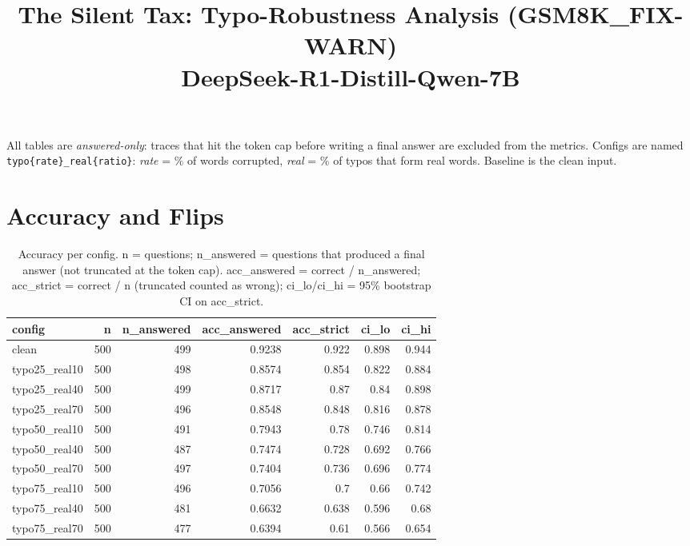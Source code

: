 \documentclass[11pt]{article}
\title{The Silent Tax: Typo-Robustness Analysis (GSM8K\_FIX-WARN)\\\large DeepSeek-R1-Distill-Qwen-7B}
\date{}
\begin{document}
\maketitle
\noindent All tables are \emph{answered-only}: traces that hit the token cap before writing a final answer are excluded from the metrics. Configs are named \texttt{typo\{rate\}\_real\{ratio\}}: \emph{rate} = \% of words corrupted, \emph{real} = \% of typos that form real words. Baseline is the clean input.

\section*{Accuracy and Flips}
\begin{table}[H]
\centering
\caption{Accuracy per config. n = questions; n\_answered = questions that produced a final answer (not truncated at the token cap). acc\_answered = correct / n\_answered; acc\_strict = correct / n (truncated counted as wrong); ci\_lo/ci\_hi = 95\% bootstrap CI on acc\_strict.}
\small
\begin{adjustbox}{max width=\textwidth}
\begin{tabular}{lrrrrrr}
\toprule
\textbf{config} & \textbf{n} & \textbf{n\_answered} & \textbf{acc\_answered} & \textbf{acc\_strict} & \textbf{ci\_lo} & \textbf{ci\_hi} \\
\midrule
clean & 500 & 499 & 0.9238 & 0.922 & 0.898 & 0.944 \\
typo25\_real10 & 500 & 498 & 0.8574 & 0.854 & 0.822 & 0.884 \\
typo25\_real40 & 500 & 499 & 0.8717 & 0.87 & 0.84 & 0.898 \\
typo25\_real70 & 500 & 496 & 0.8548 & 0.848 & 0.816 & 0.878 \\
typo50\_real10 & 500 & 491 & 0.7943 & 0.78 & 0.746 & 0.814 \\
typo50\_real40 & 500 & 487 & 0.7474 & 0.728 & 0.692 & 0.766 \\
typo50\_real70 & 500 & 497 & 0.7404 & 0.736 & 0.696 & 0.774 \\
typo75\_real10 & 500 & 496 & 0.7056 & 0.7 & 0.66 & 0.742 \\
typo75\_real40 & 500 & 481 & 0.6632 & 0.638 & 0.596 & 0.68 \\
typo75\_real70 & 500 & 477 & 0.6394 & 0.61 & 0.566 & 0.654 \\
\bottomrule
\end{tabular}
\end{adjustbox}
\end{table}
\end{document}

